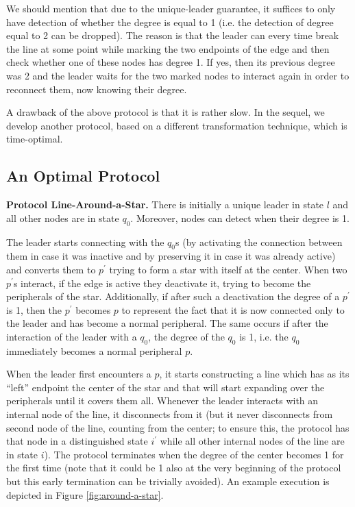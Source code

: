 \documentclass[preprint]{elsarticle}
\begin{document}
We should mention that due to the unique-leader guarantee, it suffices to only have detection of whether the degree is equal to 1 (i.e. the detection of degree equal to 2 can be dropped). The reason is that the leader can every time break the line at some point while marking the two endpoints of the edge and then check whether one of these nodes has degree 1. If yes, then its previous degree was 2 and the leader waits for the two marked nodes to interact again in order to reconnect them, now knowing their degree.

A drawback of the above protocol is that it is rather slow. In the sequel, we develop another protocol, based on a different transformation technique, which is time-optimal. 

\subsection{An Optimal Protocol}
\label{subsec:line-around-a-star}

\noindent\textbf{Protocol Line-Around-a-Star.} There is initially a unique leader in state $l$ and all other nodes are in state $q_0$. Moreover, nodes can detect when their degree is 1.

The leader starts connecting with the $q_0$s (by activating the connection between them in case it was inactive and by preserving it in case it was already active) and converts them to $p^\prime$ trying to form a star with itself at the center. When two $p^\prime$s interact, if the edge is active they deactivate it, trying to become the peripherals of the star. Additionally, if after such a deactivation the degree of a $p^\prime$ is 1, then the $p^\prime$ becomes $p$ to represent the fact that it is now connected only to the leader and has become a normal peripheral. The same occurs if after the interaction of the leader with a $q_0$, the degree of the $q_0$ is 1, i.e. the $q_0$ immediately becomes a normal peripheral $p$.

When the leader first encounters a $p$, it starts constructing a line which has as its ``left'' endpoint the center of the star and that will start expanding over the peripherals until it covers them all. Whenever the leader interacts with an internal node of the line, it disconnects from it (but it never disconnects from second node of the line, counting from the center; to ensure this, the protocol has that node in a distinguished state $i^\prime$ while all other internal nodes of the line are in state $i$). The protocol terminates when the degree of the center becomes 1 for the first time (note that it could be 1 also at the very beginning of the protocol but this early termination can be trivially avoided). An example execution is depicted in Figure \ref{fig:around-a-star}.
\end{document}
